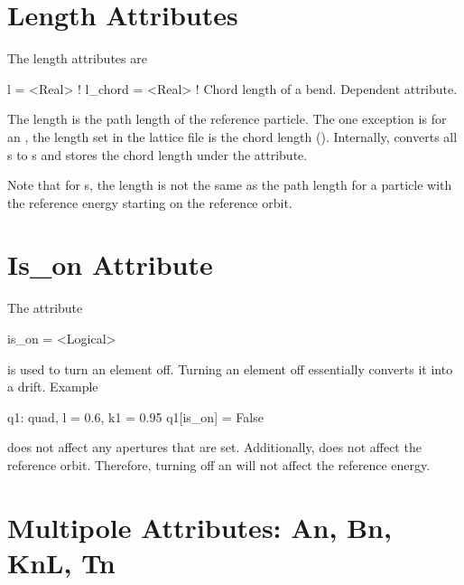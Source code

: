 \section{Length Attributes}
\label{s:l}

The length attributes are
\begin{example}
  l       = <Real>  ! 
  l_chord = <Real>  ! Chord length of a bend. Dependent attribute.
\end{example}
The length  is the path length of the reference particle. The
one exception is for an , the length  set in the
lattice file is the chord length (). Internally, \bmad
converts all s to s and stores the chord length
under the  attribute.

Note that for s,
the length  is not the same as the path length for a particle
with the reference energy starting on the reference orbit.

\section{Is_on Attribute}
\label{s:is.on}

The  attribute
\begin{example}
  is_on = <Logical>
\end{example}
is used to turn an element off. Turning
an element off essentially converts it into a drift.
Example
\begin{example}
  q1: quad, l = 0.6, k1 = 0.95
  q1[is_on] = False
\end{example}

 does not affect any apertures that are set. Additionally,
 does not affect the reference orbit. Therefore, turning 
off an  will not affect the reference energy.

\section{Multipole Attributes: An, Bn, KnL, Tn}
\label{s:multip}

